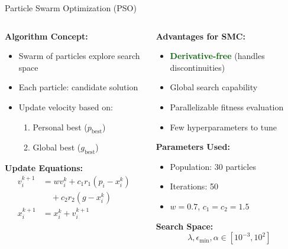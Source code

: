 \documentclass[10pt,aspectratio=169]{beamer}
\newcommand{\emphgreen}[1]{\textcolor{darkgreen}{\textbf{#1}}}
\begin{document}
\begin{frame}{Particle Swarm Optimization (PSO)}
\begin{columns}
\begin{column}{0.5\textwidth}
\textbf{Algorithm Concept:}
\begin{itemize}
    \item Swarm of particles explore search space
    \item Each particle: candidate solution
    \item Update velocity based on:
    \begin{enumerate}
        \item Personal best ($p_{\text{best}}$)
        \item Global best ($g_{\text{best}}$)
    \end{enumerate}
\end{itemize}

\vspace{0.3cm}
\textbf{Update Equations:}
\begin{align*}
v_{i}^{k+1} &= w v_{i}^{k} + c_1 r_1 (p_{i} - x_{i}^{k}) \\
&\quad + c_2 r_2 (g - x_{i}^{k}) \\
x_{i}^{k+1} &= x_{i}^{k} + v_{i}^{k+1}
\end{align*}
\end{column}
\begin{column}{0.5\textwidth}
\textbf{Advantages for SMC:}
\begin{itemize}
    \item \emphgreen{Derivative-free} (handles discontinuities)
    \item Global search capability
    \item Parallelizable fitness evaluation
    \item Few hyperparameters to tune
\end{itemize}

\vspace{0.3cm}
\textbf{Parameters Used:}
\begin{itemize}
    \item Population: 30 particles
    \item Iterations: 50
    \item $w = 0.7$, $c_1 = c_2 = 1.5$
\end{itemize}

\vspace{0.3cm}
\textbf{Search Space:}
\[
\lambda, \epsilon_{\min}, \alpha \in [10^{-3}, 10^{2}]
\]
\end{column}
\end{columns}
\end{frame}
\end{document}
